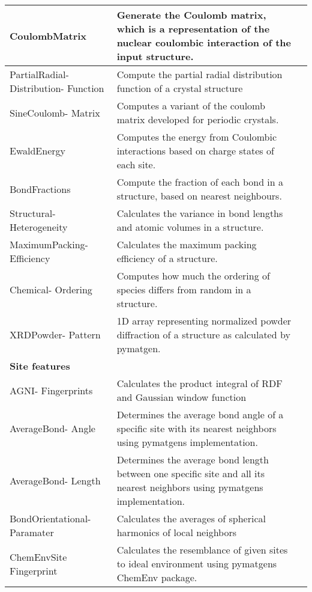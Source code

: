 \begin{center}
\begin{longtable}{M{3.5cm} M{6.5cm} M{2.0cm}}
  CoulombMatrix & Generate the Coulomb matrix, which is a representation of the nuclear coulombic interaction of the input structure. & \cite{Rupp2012}  \\ \hline
  PartialRadial- Distribution- Function & Compute the partial radial distribution function of a crystal structure & \cite{Schuett2014}  \\ \hline
  SineCoulomb- Matrix & Computes a variant of the coulomb matrix developed for periodic crystals. & \cite{Faber2015}  \\ \hline
  EwaldEnergy & Computes the energy from Coulombic interactions based on charge states of each site. & \cite{Ewald1921}  \\ \hline
  BondFractions & Compute the fraction of each bond in a structure, based on nearest neighbours. & \cite{Hansen2015}  \\ \hline
  Structural- Heterogeneity & Calculates the variance in bond lengths and atomic volumes in a structure. & \cite{Ward2017}  \\ \hline
  MaximumPacking- Efficiency & Calculates the maximum packing efficiency of a structure. & \cite{Ward2017} \\ \hline
  Chemical- Ordering & Computes how much the ordering of species differs from random in a structure. & \cite{Ward2017}  \\ \hline
  XRDPowder- Pattern & 1D array representing normalized powder diffraction of a structure as calculated by pymatgen. & \cite{Ong2013} \\
  \hline
  \textbf{Site features} & & \\
  \hline
  AGNI- Fingerprints & Calculates the product integral of RDF and Gaussian window function & \cite{Botu2014}  \\ \hline
  AverageBond- Angle & Determines the average bond angle of a specific site with its nearest neighbors using pymatgens implementation. & \cite{Jong2016}  \\ \hline
  AverageBond- Length & Determines the average bond length between one specific site and all its nearest neighbors using pymatgens implementation. & \cite{Jong2016}  \\ \hline
  BondOrientational- Paramater & Calculates the averages of spherical harmonics of local neighbors & \cite{Seko2017, Steinhardt1983}  \\ \hline
  ChemEnvSite Fingerprint & Calculates the resemblance of given sites to ideal environment using pymatgens ChemEnv package. & \cite{Waroquiers2017, Zimmermann2017}  \\ \hline

\end{longtable}
\end{center}
